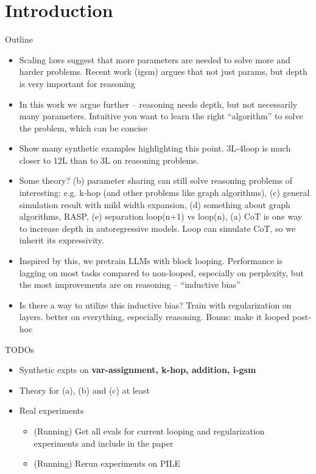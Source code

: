 \section{Introduction}
\label{sec:intro}



\iffalse

Outline
\begin{itemize}
    \item Scaling laws suggest that more parameters are needed to solve more and harder problems. Recent work (igsm) argues that not just params, but depth is very important for reasoning
    \item In this work we argue further -- reasoning needs depth, but not necessarily many parameters. Intuitive you want to learn the right ``algorithm'' to solve the problem, which can be concise
    \item Show many synthetic examples highlighting this point. 3L-4loop is much closer to 12L than to 3L on reasoning problems.
    \item Some theory? (b) parameter sharing can still solve reasoning problems of interesting: e.g. k-hop (and other problems like graph algorithms), (c) general simulation result with mild width expansion, (d) something about graph algorithms, RASP, (e) separation loop(n+1) vs loop(n), (a) CoT is one way to increase depth in autoregressive models. Loop can simulate CoT, so we inherit its expressivity.
    \item Inspired by this, we pretrain LLMs with block looping. Performance is lagging on most tasks compared to non-looped, especially on perplexity, but the most improvements are on reasoning -- ``inductive bias''
    \item Is there a way to utilize this inductive bias? Train with regularization on layers. better on everything, especially reasoning. Bonus: make it looped post-hoc
\end{itemize}



TODOs
\begin{itemize}
    \item Synthetic expts on \textbf{var-assignment, k-hop, addition, i-gsm}
    \item Theory for (a), (b) and (c) at least
    \item Real experiments
    \begin{itemize}
        \item (Running) Get all evals for current looping and regularization experiments and include in the paper
        \item (Running) Rerun experiments on PILE 
    \end{itemize}
\end{itemize}

